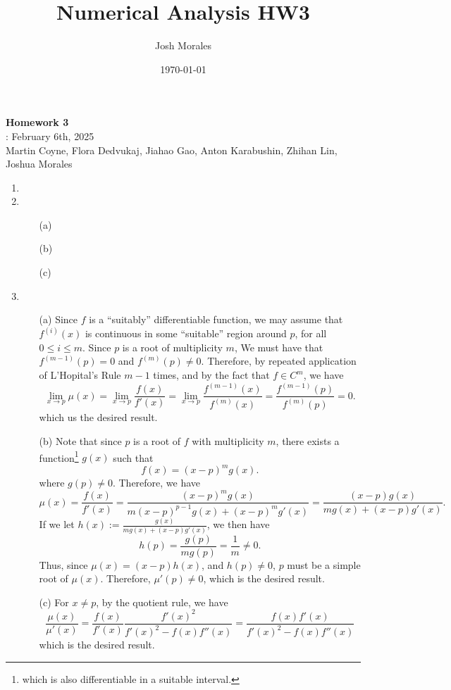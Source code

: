 \documentclass[12pt]{article}
\title{Numerical Analysis HW3}
\author{Josh Morales}
\date{\today}
\begin{document}
\pagestyle{fancy}
\begin{center}
\textbf{\Large Homework 3} \\
: February 6th, 2025\\
Martin Coyne, Flora Dedvukaj, Jiahao Gao, Anton Karabushin, Zhihan Lin, Joshua Morales
\end{center}
\begin{enumerate}[leftmargin=2em]
    \item

    \item 
    \begin{enumerate}
        \item[(a)]
        
        \item[(b)]
        
        \item[(c)]  
    \end{enumerate}


    \item
    \begin{enumerate}
	  \item[(a)] Since $f$ is a ``suitably'' differentiable function, we may assume that $f^{(i)}(x)$ is continuous in some ``suitable'' region around $p$, for all $0\leq i\leq m$. Since $p$ is a root of multiplicity $m$, 
		We must have that $f^{(m-1)}(p)=0$ and $f^{(m)}(p)\neq 0$. Therefore, by repeated application of L'Hopital's Rule $m-1$ times, and by the fact that $f\in C^m$, we have
		\[
		  \lim_{x\to p}\mu(x)=\lim_{x\to p} \frac{f(x)}{f'(x)} = \lim_{x\to p}\frac{f^{(m-1)}(x)}{f^{(m)}(x)}=\frac{f^{(m-1)}(p)}{f^{(m)}(p)}=0	
		.\] 
		which us the desired result.	
	  \item[(b)] Note that since $p$ is a root of $f$ with multiplicity $m$, there exists a function\footnote{which is also differentiable in a suitable interval.} $g(x)$ such that 
		  \[f(x)={(x-p)}^m g(x).\] 
		where $g(p)\neq 0$. Therefore, we have 
		  \[
		  \mu(x)=\frac{f(x)}{f'(x)}
		  =\frac{{(x-p)}^m g(x)}{m{(x-p)}^{p-1}g(x)+{(x-p)}^m g'(x)}=\frac{(x-p)g(x)}{mg(x)+(x-p)g'(x)}
	 	 .\] 
		 If we let $h(x):=\frac{g(x)}{mg(x)+(x-p)g'(x)}$, we then have
		 \[h(p)=\frac{g(p)}{mg(p)}=\frac{1}{m}\neq 0.\] 
		Thus, since $\mu(x)=(x-p)h(x)$, and $h(p)\neq 0$, $p$ must be a simple root of $\mu(x)$. Therefore, $\mu'(p)\neq 0$, which is the desired result. 
        \item[(c)] For $x\neq p$, by the quotient rule, we have 
		\[\frac{\mu(x)}{\mu'(x)}=\frac{f(x)}{f'(x)}\frac{{f'(x)}^2}{{f'(x)}^2-f(x)f''(x)}=\frac{f(x)f'(x)}{{f'(x)}^2-f(x)f''(x)}\]
		which is the desired result.
    \end{enumerate}
    

\end{enumerate}
\end{document}
